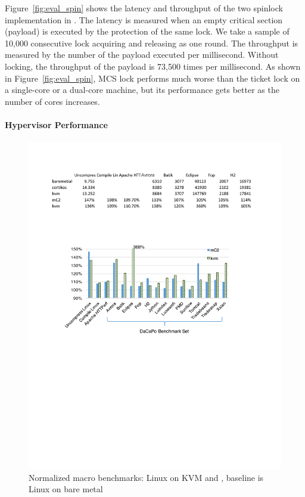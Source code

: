 Figure~\ref{fig:eval_spin} shows the latency and throughput of the two
spinlock implementation in \cCTOS. The latency is measured when an
empty critical section (payload) is executed by the protection of the
same lock. We take a sample of 10,000 consecutive lock acquiring and
releasing as one round.  The throughput is measured by the
number of the payload executed per millisecond. Without locking, the
throughput of the payload is 73,500 times per millisecond.  As shown
in Figure~\ref{fig:eval_spin}, MCS lock performs much worse than the
ticket lock on a single-core or a dual-core machine, but its
performance gets better as the number of cores increases.


\paragraph{Hypervisor Performance} 
\begin{figure}\centering
		\includegraphics[width=12cm]{figs/hyp_macro.pdf}
		\caption{Normalized macro benchmarks: Linux on KVM and \mCTOShyper{}, baseline is Linux on bare metal}
		\label{fig:eval_macro}
		\hrulefill
\end{figure}

